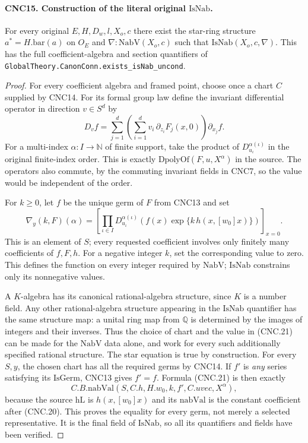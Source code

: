 \paragraph{CNC15. Construction of the literal original \(\mathrm{IsNab}\).}
\label{claim:CNC15}
For every original \(E,H,D_w,l,X_o,c\) there exist the star-ring
structure \(a^*=H.\mathrm{bar}(a)\) on \(O_E\) and
\(\nabla:\mathrm{NabV}(X_o,c)\) such that
\(\mathrm{IsNab}(X_o,c,\nabla)\).
This has the full coefficient-algebra and section quantifiers of
\texttt{GlobalTheory.CanonConn.exists\_isNab\_uncond}.
\begin{proof}
For every coefficient algebra and framed point, choose once a chart
\(C\) supplied by CNC14.  For its formal group law define the
invariant differential operator in direction \(v\in S^d\) by
\[
 D_v f=\sum_{j=1}^d\left(\sum_{i=1}^d
       v_i\,\partial_{z_i}F_j(x,0)\right)\partial_{x_j}f.
                                                               \tag{CNC.20}
\]
For a multi-index \(\alpha:I\to\mathbb N\) of finite support,
take the product of \(D_{u_\iota}^{\alpha(\iota)}\) in the
original finite-index order.  This is exactly
\(\mathrm{DpolyOf}(F,u,X^\alpha)\) in the source.  The operators
also commute, by the commuting invariant fields in CNC7, so the value
would be independent of the order.

For \(k\geq0\), let \(f\) be the unique germ of \(F\) from
CNC13 and set
\[
 \nabla_y(k,F)(\alpha)=
 \left[\prod_{\iota\in I}D_{u_\iota}^{\alpha(\iota)}
    \left(f(x)\exp\{k\,h(x,[w_0]x)\}\right)\right]_{x=0}.
                                                               \tag{CNC.21}
\]
This is an element of \(S\); every requested coefficient involves
only finitely many coefficients of \(f,F,h\).
For a negative integer \(k\), set the corresponding value to zero.
This defines the function on every integer required by
\(\mathrm{NabV}\); \(\mathrm{IsNab}\) constrains only its
nonnegative values.

A \(K\)-algebra has its canonical rational-algebra structure, since
\(K\) is a number field.  Any other rational-algebra structure appearing
in the \(\mathrm{IsNab}\) quantifier has the same structure map:
a unital ring map from \(\mathbb Q\) is determined by the images
of integers and their inverses.  Thus the choice of chart and the value
in (CNC.21) can be made for the \(\mathrm{NabV}\) data alone,
and work for every such additionally specified rational structure.
The star equation is true by construction.  For every \(S,y\), the
chosen chart has all the required germs by CNC14.  If \(f'\) is
\emph{any} series satisfying its \(\mathrm{IsGerm}\), CNC13
gives \(f'=f\).  Formula (CNC.21) is then exactly
\[
 C.B.\mathrm{nabVal}(S,C.h,H.w_0,k,f',C.uvec,X^\alpha),
\]
because the source \(\mathrm{hL}\) is \(h(x,[w_0]x)\) and
its \(\mathrm{nabVal}\) is the constant coefficient after
(CNC.20).  This proves the equality for every germ, not merely a selected
representative.  It is the final field of \(\mathrm{IsNab}\),
so all its quantifiers and fields have been verified.
\end{proof}

